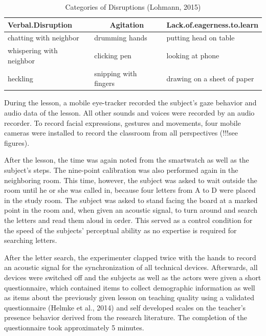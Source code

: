 \documentclass[
  man]{apa6}
\begin{document}
\begin{table}[h]

\begin{center}
\begin{threeparttable}

\caption{\label{tab:disruption_categories}Categories of Disruptions (Lohmann, 2015)}

\tiny{

\begin{tabular}{lll}
\toprule
Verbal.Disruption & \multicolumn{1}{c}{Agitation} & \multicolumn{1}{c}{Lack.of.eagerness.to.learn}\\
\midrule
chatting with neighbor & drumming hands & putting head on table\\
whispering with neighbor & clicking pen & looking at phone\\
heckling & snipping with fingers & drawing on a sheet of paper\\
\bottomrule
\end{tabular}

}

\end{threeparttable}
\end{center}

\end{table}

During the lesson, a mobile eye-tracker recorded the subject's gaze behavior and audio data of the lesson. All other sounds and voices were recorded by an audio recorder. To record facial expressions, gestures and movements, four mobile cameras were installed to record the classroom from all perspectives (!!!see figures).

After the lesson, the time was again noted from the smartwatch as well as the subject's steps. The nine-point calibration was also performed again in the neighboring room. This time, however, the subject was asked to wait outside the room until he or she was called in, because four letters from A to D were placed in the study room. The subject was asked to stand facing the board at a marked point in the room and, when given an acoustic signal, to turn around and search the letters and read them aloud in order. This served as a control condition for the speed of the subjects' perceptual ability as no expertise is required for searching letters.

After the letter search, the experimenter clapped twice with the hands to record an acoustic signal for the synchronization of all technical devices. Afterwards, all devices were switched off and the subjects as well as the actors were given a short questionnaire, which contained items to collect demographic information as well as items about the previously given lesson on teaching quality using a validated questionnaire (Helmke et al., 2014) and self developed scales on the teacher's presence behavior derived from the research literature. The completion of the questionnaire took approximately 5 minutes.
\end{document}
